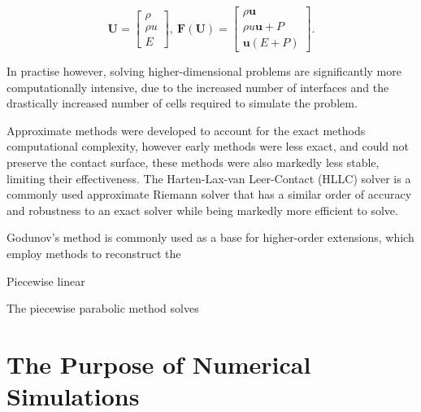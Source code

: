 \begin{equation}
  \mathbf{U} = 
  \begin{bmatrix}
    \rho \\
    \rho u \\
    E
  \end{bmatrix}
  , ~
  \mathbf{F}(\mathbf{U}) =
  \begin{bmatrix}
    \rho \boldsymbol{u} \\
    \rho u \boldsymbol{u} + P \\
    \boldsymbol{u}(E + P)
  \end{bmatrix} .
\end{equation}

In practise however, solving higher-dimensional problems are significantly more computationally intensive, due to the increased number of interfaces and the drastically increased number of cells required to simulate the problem.


Approximate methods were developed to account for the exact methods computational complexity, however early methods were less exact, and could not preserve the contact surface, these methods were also markedly less stable, limiting their effectiveness.
The Harten-Lax-van Leer-Contact (HLLC) solver \parencite{toroRestorationContactSurface1994} is a commonly used approximate Riemann solver that has a similar order of accuracy and robustness to an exact solver while being markedly more efficient to solve.


Godunov's method is commonly used as a base for higher-order extensions, which employ methods to reconstruct the 




Piecewise linear  \parencite{vanleerUltimateConservativeDifference1979}

The piecewise parabolic method solves \parencite{colella_piecewise_1984}





\section{The Purpose of Numerical Simulations}
\label{sec:numerical-purpose}

